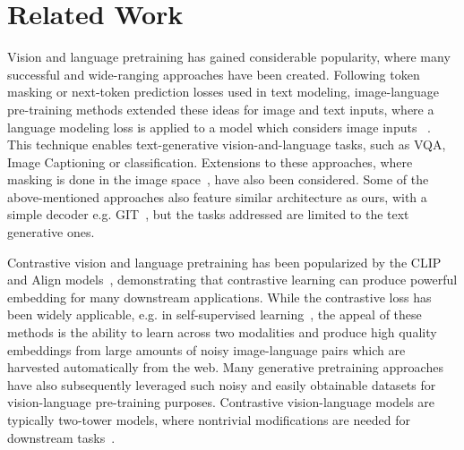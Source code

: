 \documentclass[10pt]{article} \usepackage[accepted]{tmlr}
\begin{document}
\section{Related Work}
\vspace{-2mm}
Vision and language pretraining has gained considerable popularity, where many successful and wide-ranging approaches have been created.
Following token masking or next-token prediction losses used in text modeling, image-language pre-training methods extended these ideas for image and text inputs, where a language modeling loss is applied to a model which considers image inputs   ~\citep{wang2022git,pali,wang2021simvlm,wang2022image,chen2020uniter,UnifiedVLP,VinVL,tan2019lxmert,li2020oscar,vilbert2020,su2020vlbert,meter}. This technique enables text-generative vision-and-language tasks, such as VQA, Image Captioning or classification. Extensions to these approaches, where masking is done in the image space~\citep{bao2021beit}, have also been considered. 
Some of the above-mentioned approaches also feature similar architecture as ours, with a simple decoder e.g. GIT~\citep{wang2022git}, but the tasks addressed are limited to the text generative ones.
 

Contrastive vision and language pretraining has been popularized by the CLIP and Align models~\citep{radford2021clip,align}, demonstrating that contrastive learning can produce powerful embedding for many downstream applications. While the contrastive loss has been widely applicable, e.g. in self-supervised learning~\citep{chen2020simple}, the appeal of these methods is the ability to learn across two modalities and produce high quality embeddings from large amounts of noisy image-language pairs which are harvested automatically from the web. Many generative pretraining approaches have also subsequently leveraged such noisy and easily obtainable datasets for vision-language pre-training purposes.  
Contrastive vision-language models are typically two-tower models, where nontrivial modifications are needed for downstream tasks~\citep{yuan2021florence}.
\end{document}
